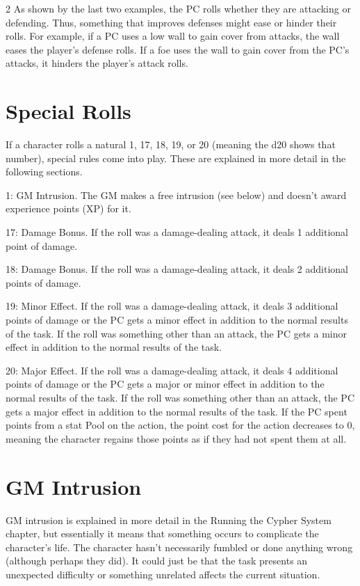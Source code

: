 \begin{multicols}{2}
As shown by the last two examples, the PC rolls whether they are attacking or defending. Thus, something that improves defenses might ease or hinder their rolls. For example, if a PC uses a low wall to gain cover from attacks, the wall eases the player’s defense rolls. If a foe uses the wall to gain cover from the PC’s attacks, it hinders the player’s attack rolls.

\section{Special Rolls}

If a character rolls a natural 1, 17, 18, 19, or 20 (meaning the d20 shows that number), special rules come into play. These are explained in more detail in the following sections.

1: GM Intrusion. The GM makes a free intrusion (see below) and doesn’t award experience points (XP) for it.

17: Damage Bonus. If the roll was a damage-dealing attack, it deals 1 additional point of damage.

18: Damage Bonus. If the roll was a damage-dealing attack, it deals 2 additional points of damage.

19: Minor Effect. If the roll was a damage-dealing attack, it deals 3 additional points of damage or the PC gets a minor effect in addition to the normal results of the task. If the roll was something other than an attack, the PC gets a minor effect in addition to the normal results of the task.

20: Major Effect. If the roll was a damage-dealing attack, it deals 4 additional points of damage or the PC gets a major or minor effect in addition to the normal results of the task. If the roll was something other than an attack, the PC gets a major effect in addition to the normal results of the task. If the PC spent points from a stat Pool on the action, the point cost for the action decreases to 0, meaning the character regains those points as if they had not spent them at all.

\section{GM Intrusion}

GM intrusion is explained in more detail in the Running the Cypher System chapter, but essentially it means that something occurs to complicate the character’s life. The character hasn’t necessarily fumbled or done anything wrong (although perhaps they did). It could just be that the task presents an unexpected difficulty or something unrelated affects the current situation.


\end{multicols}
